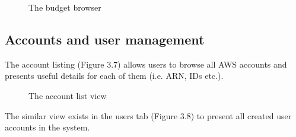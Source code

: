 \documentclass[licencjacka,en]{thesisclass}
\begin{document}
    \begin{figure}[H]
      \caption{The budget browser\label{fig:scr-budget-browse}}
    \end{figure}

    \subsection{Accounts and user management}

    The account listing (Figure 3.7) allows users to browse all AWS accounts
    and presents useful details for each of them (i.e. ARN, IDs etc.).

    \begin{figure}[H]
      \caption{The account list view\label{fig:scr-account-browse}}
    \end{figure}

    The similar view exists in the users tab (Figure 3.8) to present all created user accounts in the system.
\end{document}

